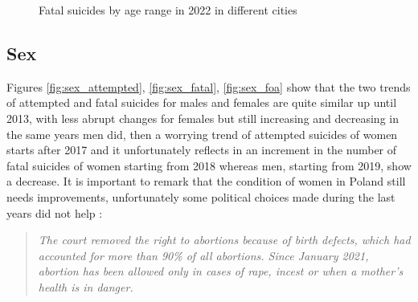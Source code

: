 \documentclass{article}
\begin{document}
\begin{figure}[H]
\begin{minipage}{0.45\textwidth}
        \caption{Fatal suicides by age range in 2022 in different cities}
	\label{fig:age_city_op-fat-2022}
    \end{minipage}
\end{figure}
%
%
%

%
\subsection{Sex}
Figures \ref{fig:sex_attempted}, \ref{fig:sex_fatal}, \ref{fig:sex_foa}
show that the two trends of attempted and fatal suicides for males and females
are quite similar up until 2013, with less abrupt changes for females but still
increasing and decreasing in the same years men did, then a worrying trend of attempted 
suicides of women starts after 2017 and it unfortunately reflects in an increment
in the number of fatal suicides of women starting from 2018 whereas men, starting from 2019, show a decrease.
It is important to remark that the condition of women in Poland still needs improvements,
unfortunately some political choices made during the last years did not help \footnotemark{}:
\begin{quote}
\textit{The court removed the right to abortions because of birth defects, 
which had accounted for more than 90\% of all abortions. Since January 2021, 
abortion has been allowed only in cases of rape, incest or when a mother's 
health is in danger.}
\end{quote}
%
\end{document}
